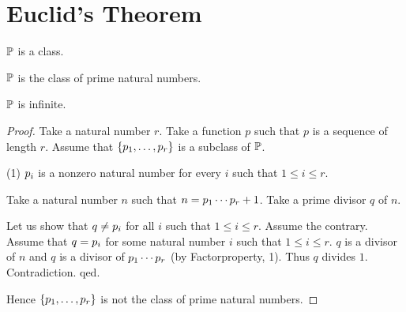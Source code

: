 \documentclass[11pt]{article}
\begin{document}
\section{Euclid's Theorem}

\begin{forthel}

\begin{signature}
  $\mathbb{P}$ is a class.
\end{signature}

\begin{axiom}
  $\mathbb{P}$ is the class of prime natural numbers.
\end{axiom}

\begin{theorem}[Euclid]
$\mathbb{P}$ is infinite.
\end{theorem}
\begin{proof}
Take a natural number $r$.
Take a function $p$ such that $p$ is a sequence of length $r$.
Assume that $\{p_{1},\dots,p_{r}\}$ is a subclass of $\mathbb{P}$.

(1) $p_{i}$ is a nonzero natural number for every $i$ such
that $1 \leq i \leq r$.

Take a natural number $n$ such that $n=p_{1} \cdots p_{r}+1$.
Take a prime divisor $q$ of $n$.

Let us show that $q \neq p_{i}$ for all $i$ such that  $1 \leq i \leq r$.
  Assume the contrary.
  Assume that $q=p_{i}$ for some natural number $i$ such that
  $1 \leq i \leq r$.
  $q$ is a divisor of $n$ and $q$ is a divisor of $p_{1} \cdots p_{r}$
  (by Factorproperty, 1).
  Thus $q$ divides $1$. Contradiction.
qed.

Hence $\{p_{1},\dots,p_{r}\}$ is not the class of prime natural numbers.
\end{proof}
\end{forthel}
\end{document}
